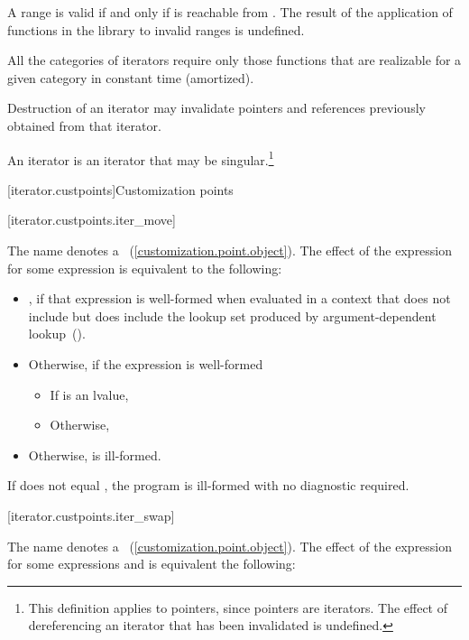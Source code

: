\pnum
A range 
is valid if and only if
is reachable from
.
The result of the application of functions in the library to invalid ranges is
undefined.

\pnum
All the categories of iterators require only those functions that are realizable for a given category in
constant time (amortized).

\pnum
Destruction of an iterator may invalidate pointers and references
previously obtained from that iterator.

\pnum
An
iterator is an iterator that may be singular.\footnote{This definition applies to pointers, since pointers are iterators.
The effect of dereferencing an iterator that has been invalidated
is undefined.
}

[iterator.custpoints]{Customization points}

[iterator.custpoints.iter_move]{}

\pnum
The name  denotes a ~(\ref{customization.point.object}). The effect of the expression
 for some expression  is equivalent to the
following:

\begin{itemize}
\item {}, if that expression is well-formed when evaluated in
a context that does not include  but does include the
lookup set produced by argument-dependent lookup~().
\item Otherwise, if the expression  is well-formed
\begin{itemize}
\item If  is an lvalue, 
\item Otherwise, 
\end{itemize}
\item Otherwise,  is ill-formed.
\end{itemize}

\pnum
If  does not equal , the program is
ill-formed with no diagnostic required.

[iterator.custpoints.iter_swap]{}

\pnum
The name  denotes a ~(\ref{customization.point.object}). The effect of the expression
 for some expressions  and 
is equivalent the following:

